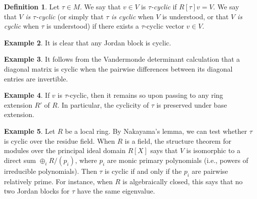 \documentclass[reqno]{amsart}
\theoremstyle{plain} \newtheorem{theorem} {Theorem} \newtheorem{conjecture} {Conjecture} \newtheorem{corollary} [theorem] {Corollary} \newtheorem{proposition} [theorem] {Proposition} \newtheorem{fact} [theorem] {Fact}
\theoremstyle{definition} \newtheorem{definition} [theorem] {Definition}
\newtheorem{example} [theorem] {Example} \newtheorem{assertion}
\theoremstyle{itplain} %
\begin{document}
\begin{definition}\label{definition:cyclic}
  Let $\tau \in M$.  We say that $v \in V$ is \emph{$\tau$-cyclic} if $R[\tau] v = V$.  We say that \emph{$V$ is $\tau$-cyclic} (or simply that \emph{$\tau$ is cyclic} when $V$ is understood, or that \emph{$V$ is cyclic} when $\tau$ is understood) if there exists a $\tau$-cyclic vector $v \in V$.
\end{definition}
\begin{example}
  It is clear that any Jordan block is cyclic.
\end{example}
\begin{example}
  It follows from the Vandermonde determinant calculation that a diagonal matrix is cyclic when the pairwise differences between its diagonal entries are invertible.
\end{example}
\begin{example}
  If $v$ is $\tau$-cyclic, then it remains so upon passing to any ring extension $R'$ of $R$.  In particular, the cyclicity of $\tau$ is preserved under base extension.
\end{example}
\begin{example}
  Let $R$ be a local ring.  By Nakayama's lemma, we can test whether $\tau$ is cyclic over the residue field.  When $R$ is a field, the structure theorem for modules over the principal ideal domain $R[X]$ says that $V$ is isomorphic to a direct sum $\oplus_i R / (p_i)$, where $p_i$ are monic primary polynomials (i.e., powers of irreducible polynomials).  Then $\tau$ is cyclic if and only if the $p_i$ are pairwise relatively prime.  For instance, when $R$ is algebraically closed, this says that no two Jordan blocks for $\tau$ have the same eigenvalue.
\end{example}
\end{document}
